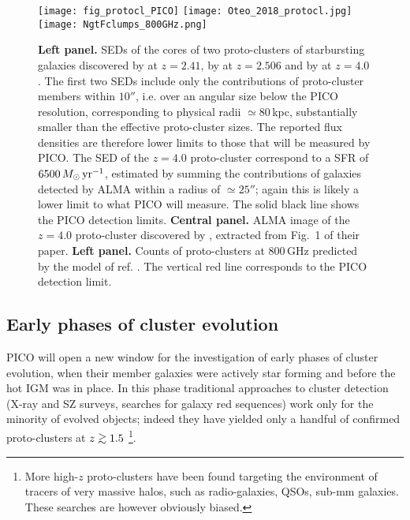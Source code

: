 \documentclass[11pt,a4paper]{article}
\def\simgt{\mathrel{\rlap{\lower 3pt\hbox{$\sim$}} \raise2.0pt\hbox{$>$}}}
\begin{document}
\begin{figure*}
\begin{center}
\texttt{[image: fig\_protocl\_PICO]}
\texttt{[image: Oteo\_2018\_protocl.jpg]}
\texttt{[image: NgtFclumps\_800GHz.png]}
\caption{\textbf{Left panel.} SEDs of the cores of two proto-clusters of starbursting galaxies  discovered by \cite{Ivison2013} at $z=2.41$, by \cite{Wang2016} at $z=2.506$ and by \cite{Oteo2018} at $z=4.0$. The first two SEDs include only the contributions of proto-cluster members within $10''$, i.e. over an angular size below the PICO resolution, corresponding to physical radii $\simeq 80\,$kpc, substantially smaller than the effective proto-cluster sizes. The reported flux densities are therefore lower limits to those that will be measured by PICO. The SED of the $z=4.0$ proto-cluster correspond to a SFR of $6500\,M_\odot\,\hbox{yr}^{-1}$, estimated by \cite{Oteo2018} summing the contributions of galaxies detected by ALMA within a radius of $\simeq 25''$; again this is likely a lower limit to what PICO will measure. The solid black line shows the PICO detection limits. \textbf{Central panel.} ALMA image of the $z=4.0$ proto-cluster discovered by \cite{Oteo2018}, extracted from Fig.~1 of their paper. \textbf{Left panel.} Counts of proto-clusters at 800\,GHz predicted by the  model of ref. \cite{Negrello2017protocl}. The vertical red line corresponds to the PICO detection limit.
}
\label{fig:protocluster}
\end{center}
\end{figure*}


\subsection{Early phases of cluster evolution}

PICO will open a new window for the investigation of early phases of cluster evolution, when their member galaxies were actively star forming and before the hot IGM was in place. In this phase traditional approaches to cluster detection (X-ray and SZ surveys, searches for galaxy red sequences) work only for the minority of evolved objects; indeed they have yielded only a handful of confirmed proto-clusters at $z\simgt 1.5$ \cite{Overzier2016}\footnote{More high-$z$ proto-clusters have been found targeting the environment of tracers of very massive halos, such as radio-galaxies, QSOs, sub-mm galaxies. These searches are however obviously biased.}.
\end{document}
